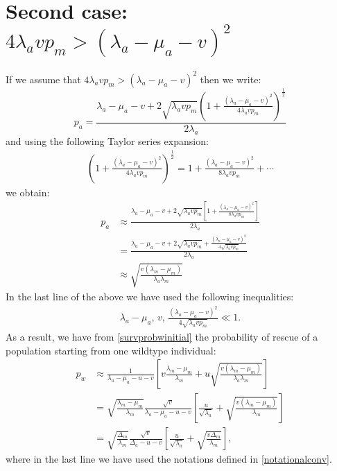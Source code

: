\documentclass[11pt,a4paper]{article}
\begin{document}
\section{Second case: $4\lambda_avp_m>\left(\lambda_a-\mu_a-v\right)^2$}
If we assume that  $4\lambda_avp_m>\left(\lambda_a-\mu_a-v\right)^2$ then we write:
\begin{equation}
p_a=\frac{\lambda_a-\mu_a-v+2\sqrt{\lambda_a vp_m}\left(1+\frac{\left(\lambda_a-\mu_a-v\right)^2}{4\lambda_avp_m}\right)^{\frac12}}{2\lambda_a}
\end{equation}
and using the following Taylor series expansion:
\begin{align*}
\left(1+\frac{\left(\lambda_a-\mu_a-v\right)^2}{4\lambda_avp_m}\right)^{\frac{1}{2}}=1+\frac{\left(\lambda_a-\mu_a-v\right)^2}{8\lambda_avp_m}+\cdots
\end{align*}
we obtain:
\begin{align*}
p_a&\approx\frac{\lambda_a-\mu_a-v+2\sqrt{\lambda_a vp_m}\left[1+\frac{\left(\lambda_a-\mu_a-v\right)^2}{8\lambda_avp_m}\right]}{2\lambda_a}\\
&=\frac{\lambda_a-\mu_a-v+2\sqrt{\lambda_a vp_m}+\frac{\left(\lambda_a-\mu_a-v\right)^2}{4\sqrt{\lambda_avp_m}}}{2\lambda_a}\\
&\approx\sqrt{\frac{v\left(\lambda_m-\mu_m\right)}{\lambda_a\lambda_m}}
\end{align*}
In the last line of the above we have used the following inequalities:
\begin{align*}
\lambda_a-\mu_a,\,v,\,\frac{\left(\lambda_a-\mu_a-v\right)^2}{4\sqrt{\lambda_avp_m}}\ll1.
\end{align*}
As a result, we have from \eqref{survprobwinitial} the probability of rescue of a population starting from one wildtype individual:
\begin{align*}
p_w&\approx\frac{1}{\lambda_a-\mu_a-u-v}\left[v\frac{\lambda_m-\mu_m}{\lambda_m}+u\sqrt{\frac{v\left(\lambda_m-\mu_m\right)}{\lambda_a\lambda_m}}\right]\\
&=\sqrt{\frac{\lambda_m-\mu_m}{\lambda_m}}\frac{\sqrt{v}}{\lambda_a-\mu_a-u-v}\left[\frac{u}{\sqrt{\lambda_a}}+\sqrt{\frac{v\left(\lambda_m-\mu_m\right)}{\lambda_m}}\right]\\
&=\sqrt{\frac{\Delta_m}{\lambda_m}}\frac{\sqrt{v}}{\Delta_a-u-v}\left[\frac{u}{\sqrt{\lambda_a}}+\sqrt{\frac{v\Delta_m}{\lambda_m}}\right],
\end{align*}
where in the last line we have used the notations defined in \eqref{notationalconv}.
\end{document}
